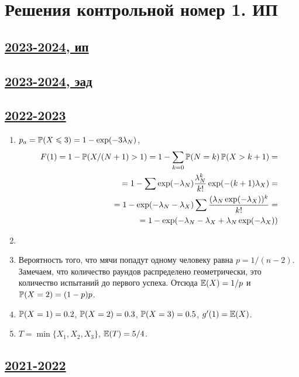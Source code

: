 \thispagestyle{empty}
\section{Решения контрольной номер 1. ИП}


\subsection[2023-2024, ип]{\hyperref[sec:kr_01_ip_2023_2024]{2023-2024, ип}}
\label{sec:sol_kr_01_ip_2023_2024}


\subsection[2023-2024, эад]{\hyperref[sec:kr_01_ead_2023_2024]{2023-2024, эад}}
\label{sec:sol_kr_01_ead_2023_2024}


\subsection[2022-2023]{\hyperref[sec:kr_01_ip_2022_2023]{2022-2023}}
\label{sec:sol_kr_01_ip_2022_2023}

\begin{enumerate}
  \item $p_a = \P(X \leq 3) = 1 - \exp(-3\lambda_N)$, 
  \begin{align*}
  F(1) = 1 - \P(X / (N+1)>1) = 1 - \sum_{k=0} \P(N = k) \P(X > k+1) = \\
  = 1 - \sum \exp(-\lambda_N) \frac{\lambda_N^k}{k!} \exp( - (k+1)\lambda_X) = \\
  = 1 - \exp(-\lambda_N - \lambda_X) \sum \frac{(\lambda_N \exp(-\lambda_X))^k}{k!} = \\
  = 1 - \exp(-\lambda_N - \lambda_X + \lambda_N \exp(-\lambda_X))
  \end{align*}
  \item 
  \item Вероятность того, что мячи попадут одному человеку равна $p = 1/(n-2)$. 
  Замечаем, что количество раундов распределено геометрически, это количество испытаний до первого успеха. 
  Отсюда $\E(X) = 1/p$ и $\P(X = 2) = (1-p) p$.
  \item $\P(X=1)=0.2$, $\P(X=2)=0.3$, $\P(X=3)=0.5$, $g'(1) = \E(X)$.
  \item $T = \min\{ X_1, X_2, X_3 \}$, $\E(T) = 5/4$.
\end{enumerate}


\subsection[2021-2022]{\hyperref[sec:kr_01_ip_2021_2022]{2021-2022}}
\label{sec:sol_kr_01_ip_2021_2022}

